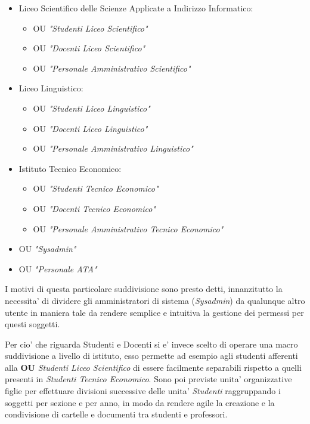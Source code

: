 \documentclass{report}
\begin{document}
				\begin{itemize}
					\item Liceo Scientifico delle Scienze Applicate a Indirizzo Informatico:
						\begin{itemize}
							\item OU \textit{"Studenti Liceo Scientifico"}
							\item OU \textit{"Docenti Liceo Scientifico"}
							\item OU \textit{"Personale Amministrativo Scientifico"}
						\end{itemize}
					\item Liceo Linguistico:
						\begin{itemize}
							\item OU \textit{"Studenti Liceo Linguistico"}
							\item OU \textit{"Docenti Liceo Linguistico"}
							\item OU \textit{"Personale Amministrativo Linguistico"}
						\end{itemize}
					\item Istituto Tecnico Economico:
						\begin{itemize}
							\item OU \textit{"Studenti Tecnico Economico"}
							\item OU \textit{"Docenti Tecnico Economico"}
							\item OU \textit{"Personale Amministrativo Tecnico Economico"}
						\end{itemize}
					\item OU \textit{"Sysadmin"}
					\item OU \textit{"Personale ATA"}
				\end{itemize}
				I motivi di questa particolare suddivisione sono presto detti, innanzitutto la  necessita' di dividere 
				gli amministratori di sistema (\emph{Sysadmin}) da qualunque altro utente in maniera tale da rendere 
				semplice e intuitiva la gestione dei permessi per questi soggetti.

				Per cio' che riguarda Studenti e Docenti si e' invece scelto di operare una macro suddivisione a livello 
				di istituto, esso permette ad esempio agli studenti afferenti alla \textbf{OU} \emph{Studenti Liceo Scientifico}
				di essere facilmente separabili rispetto a quelli presenti in \emph{Studenti Tecnico Economico}. Sono
				poi previste unita' organizzative figlie per effettuare divisioni successive delle unita' \emph{Studenti}
				raggruppando i soggetti per sezione e per anno, in modo da rendere agile la creazione e la condivisione di
				cartelle e documenti tra studenti e professori.
\end{document}
